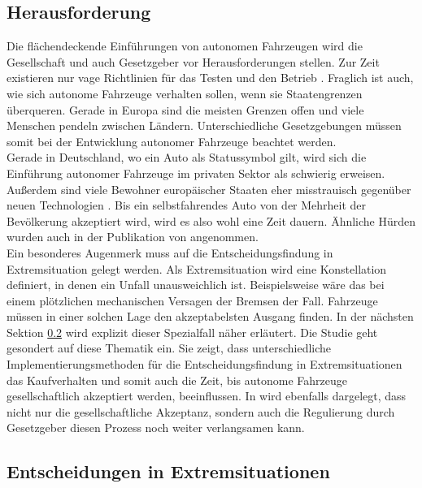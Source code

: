 \subsection{Herausforderung}

Die flächendeckende Einführungen von autonomen Fahrzeugen wird die Gesellschaft und auch Gesetzgeber vor Herausforderungen stellen. Zur Zeit existieren nur vage Richtlinien für das Testen und den Betrieb \cite{doi:10.1080/01441647.2018.1494640}. Fraglich ist auch, wie sich autonome Fahrzeuge verhalten sollen, wenn sie Staatengrenzen überqueren. Gerade in Europa sind die meisten Grenzen offen und viele Menschen pendeln zwischen Ländern. Unterschiedliche Gesetzgebungen müssen somit bei der Entwicklung autonomer Fahrzeuge beachtet werden.\\

Gerade in Deutschland, wo ein Auto als Statussymbol gilt, wird sich die Einführung autonomer Fahrzeuge im privaten Sektor als schwierig erweisen. Außerdem sind viele Bewohner europäischer Staaten eher misstrauisch gegenüber neuen Technologien \cite{technikRadar2019}. Bis ein selbstfahrendes Auto von der Mehrheit der Bevölkerung akzeptiert wird, wird es also wohl eine Zeit dauern. Ähnliche Hürden wurden auch in der Publikation \cite{roadblocks} von \citeauthor{roadblocks} angenommen.\\

Ein besonderes Augenmerk muss auf die Entscheidungsfindung in Extremsituation gelegt werden. Als Extremsituation wird eine Konstellation definiert, in denen ein Unfall unausweichlich ist. Beispielsweise wäre das bei einem plötzlichen mechanischen Versagen der Bremsen der Fall. Fahrzeuge müssen in einer solchen Lage den akzeptabelsten Ausgang finden. In der nächsten Sektion \ref{ssec:entscheidungen-in-extremsituationen} wird explizit dieser Spezialfall näher erläutert. Die Studie \cite{socialDilemma} geht gesondert auf diese Thematik ein. Sie zeigt, dass unterschiedliche Implementierungsmethoden für die Entscheidungsfindung in Extremsituationen das Kaufverhalten und somit auch die Zeit, bis autonome Fahrzeuge gesellschaftlich akzeptiert werden, beeinflussen. In \citeauthor{socialDilemma} wird ebenfalls dargelegt, dass nicht nur die gesellschaftliche Akzeptanz, sondern auch die Regulierung durch Gesetzgeber diesen Prozess noch weiter verlangsamen kann.\\


\subsection{Entscheidungen in Extremsituationen}
\label{ssec:entscheidungen-in-extremsituationen}

